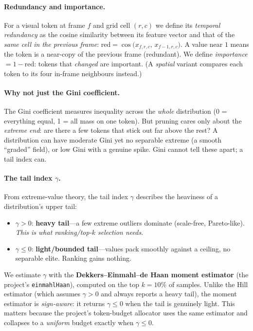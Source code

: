 \documentclass[11pt]{article}
\newcommand{\gm}{\gamma}
\begin{document}
\paragraph{Redundancy and importance.}
For a visual token at frame $f$ and grid cell $(r,c)$ we define its
\emph{temporal redundancy} as the cosine similarity between its feature vector and
that of the \emph{same cell in the previous frame}:
$\mathrm{red} = \cos\big(x_{f,r,c},\,x_{f-1,r,c}\big)$.
A value near $1$ means the token is a near-copy of the previous frame (redundant).
We define \emph{importance} $=1-\mathrm{red}$: tokens that \emph{changed} are
important. (A \emph{spatial} variant compares each token to its four in-frame
neighbours instead.)

\paragraph{Why not just the Gini coefficient.}
The Gini coefficient measures inequality across the \emph{whole} distribution
(0 = everything equal, 1 = all mass on one token). But pruning cares only about the
\emph{extreme end}: are there a few tokens that stick out far above the rest? A
distribution can have moderate Gini yet no separable extreme (a smooth ``graded''
field), or low Gini with a genuine spike. Gini cannot tell these apart; a tail
index can.

\paragraph{The tail index $\gm$.}
From extreme-value theory, the tail index $\gm$ describes the heaviness of a
distribution's upper tail:
\begin{itemize}
\item $\gm>0$: \textbf{heavy tail}---a few extreme outliers dominate (scale-free,
      Pareto-like). \emph{This is what ranking/top-$k$ selection needs.}
\item $\gm\le0$: \textbf{light/bounded tail}---values pack smoothly against a
      ceiling, no separable elite. Ranking gains nothing.
\end{itemize}
We estimate $\gm$ with the \textbf{Dekkers--Einmahl--de Haan moment estimator}
(the project's \texttt{einmahlHaan}), computed on the top $k{=}10\%$ of samples.
Unlike the Hill estimator (which assumes $\gm>0$ and always reports a heavy tail),
the moment estimator is \emph{sign-aware}: it returns $\gm\le0$ when the tail is
genuinely light. This matters because the project's token-budget allocator uses the
same estimator and collapses to a \emph{uniform} budget exactly when $\gm\le0$.
\end{document}
